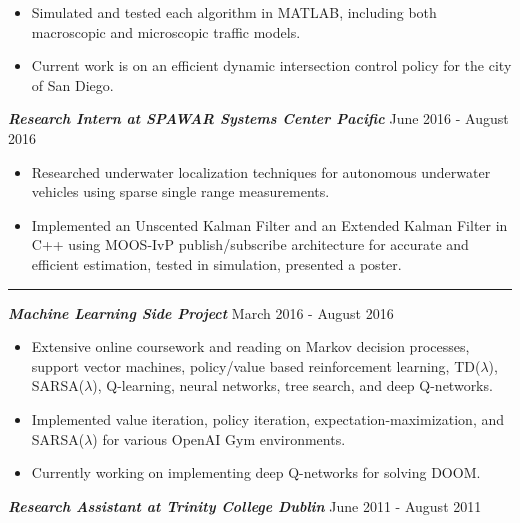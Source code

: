 \documentclass{res}
\begin{document}
\begin{resume}
\begin{itemize}
\item Simulated and tested each algorithm in MATLAB, including both macroscopic and microscopic traffic models.
\vspace*{-.5ex}
\item Current work is on an efficient dynamic intersection control policy for the city of San Diego.
\end{itemize}
\vspace*{-1ex}
{\sl \bf Research Intern at SPAWAR Systems Center Pacific } \hfill June 2016 - August 2016 
\begin{itemize}
\item Researched underwater localization techniques for autonomous underwater vehicles using sparse single range measurements. 
\vspace*{-.5ex}
\item Implemented an Unscented Kalman Filter and an Extended Kalman Filter in C++ using MOOS-IvP publish/subscribe architecture for accurate and efficient estimation, tested in simulation, presented a poster.
\vspace*{-.5ex}
\end{itemize}
\vspace*{-1ex}
\hspace{-8.5ex}\rule{16.5cm}{0.4pt}
\clearpage
{\sl \bf Machine Learning Side Project} \hfill March 2016 - August 2016 
\vspace*{.5ex}
\begin{itemize}
\item Extensive online coursework and reading on Markov decision processes, support vector machines, policy/value based reinforcement learning, TD($\lambda$), SARSA($\lambda$), Q-learning, neural networks, tree search, and deep Q-networks.
\vspace*{-.5ex}
\item Implemented value iteration, policy iteration, expectation-maximization, and SARSA($\lambda$) for various OpenAI Gym environments. 
\vspace*{-.5ex}
\item Currently working on implementing deep Q-networks for solving DOOM.
\end{itemize}
\vspace*{-1ex}
{\sl \bf Research Assistant at Trinity College Dublin} \hfill June 2011 - August 2011
\vspace*{.5ex}
\begin{itemize}

\end{itemize}
\end{resume}
\end{document}
